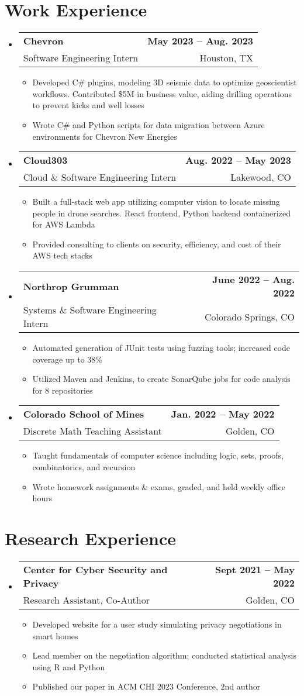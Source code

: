 \documentclass[11pt, letterpaper]{article}
\makeatletter
\newcommand{\resumeItem}[1]{
  \item\small{
    {#1 \vspace{-2pt}}
  }
}
\newcommand{\resumeSubheading}[4]{
  \vspace{-2pt}\item
    \begin{tabular*}{1.0\textwidth}[t]{l@{\extracolsep{\fill}}r}
      \textbf{#1} & \textbf{\small #2} \\
      {\small#3} & {\small #4} \\
    \end{tabular*}\vspace{-7pt}
}
\newcommand{\resumeSubHeadingListStart}{\begin{itemize}[leftmargin=0.0in, label={}]}
\newcommand{\resumeSubHeadingListEnd}{\end{itemize}}
\newcommand{\resumeItemListStart}{\begin{itemize}}
\newcommand{\resumeItemListEnd}{\end{itemize}\vspace{-5pt}}
\makeatother
\begin{document}
\section{Work Experience}   %
  \resumeSubHeadingListStart
    \resumeSubheading
      {Chevron}{May 2023 -- Aug. 2023}
      {Software Engineering Intern}{Houston, TX}
      \resumeItemListStart
        \resumeItem{
          Developed C\# plugins, modeling 3D seismic data to optimize geoscientist workflows. 
          Contributed \$5M in business value, aiding drilling operations to prevent kicks and well losses}
        \resumeItem{Wrote C\# and Python scripts for data migration between Azure environments for Chevron New Energies}
    \resumeItemListEnd
      
    \resumeSubheading
      {Cloud303}{Aug. 2022 -- May 2023}
      {Cloud \& Software Engineering Intern}{Lakewood, CO}
      \resumeItemListStart
        \resumeItem{Built a full-stack web app utilizing computer vision to locate missing people in drone searches. React frontend, Python backend containerized for AWS Lambda}
        \resumeItem{Provided consulting to clients on security, efficiency, and cost of their AWS tech stacks}
    \resumeItemListEnd
    
    \resumeSubheading
      {Northrop Grumman}{June 2022 -- Aug. 2022}
      {Systems \& Software Engineering Intern}{Colorado Springs, CO}
      \resumeItemListStart
        \resumeItem{Automated generation of JUnit tests using fuzzing tools; increased code coverage up to 38\%}
        \resumeItem{Utilized Maven and Jenkins, to create SonarQube jobs for code analysis for 8 repositories}
    \resumeItemListEnd

    \resumeSubheading
    {Colorado School of Mines}{Jan. 2022 -- May 2022}
    {Discrete Math Teaching Assistant}{Golden, CO}
    \resumeItemListStart
      \resumeItem{Taught fundamentals of computer science including logic, sets, proofs, combinatorics, and recursion}
      \resumeItem{Wrote homework assignments \& exams, graded, and held weekly office hours}
    \resumeItemListEnd
    
  \resumeSubHeadingListEnd

\section{Research Experience}   %
  \resumeSubHeadingListStart
    \resumeSubheading
      {Center for Cyber Security and Privacy}{Sept 2021 -- May 2022}
      {Research Assistant, Co-Author}{Golden, CO}
      \resumeItemListStart
        \resumeItem{Developed website for a user study simulating privacy negotiations in smart homes}
        \resumeItem{Lead member on the negotiation algorithm; conducted statistical analysis using R and Python}
        \resumeItem{Published our paper in ACM CHI 2023 Conference, 2nd author}
    \resumeItemListEnd
  \resumeSubHeadingListEnd
\end{document}
